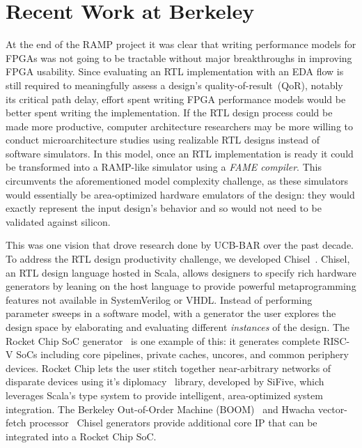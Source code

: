 \section{Recent Work at Berkeley}

At the end of the RAMP project it was clear that writing performance models for
FPGAs was not going to be tractable without major breakthroughs in improving
FPGA usability. Since evaluating an RTL implementation with an EDA flow is still
required to meaningfully assess a design's quality-of-result~(QoR), notably its critical path
delay, effort spent writing FPGA performance models would be better spent
writing the implementation. If the RTL design process could be made more productive,
computer architecture researchers may be more willing to conduct
microarchitecture studies using realizable RTL designs instead of software
simulators. In this model, once an RTL implementation is ready it could be
transformed into a RAMP-like simulator using a \emph{FAME compiler}. This circumvents the aforementioned model complexity challenge,
as these simulators would essentially be area-optimized hardware emulators of the design:
they would exactly represent the input design's behavior and so would not need
to be validated against silicon.

This was one vision that drove research done by UCB-BAR over the past decade.
To address the RTL design productivity challenge, we developed
Chisel~\cite{Chisel}. Chisel, an RTL design language hosted in Scala, allows
designers to specify rich hardware generators by leaning on the host language to provide
powerful metaprogramming features not available in SystemVerilog or VHDL.
Instead of performing parameter sweeps in a software model, with a generator
the user explores the design space by elaborating and evaluating different
\emph{instances} of the design. The Rocket Chip SoC generator~\cite{RocketChip} is one example of this: it generates complete RISC-V SoCs including
core pipelines, private caches, uncores, and common periphery devices. Rocket
Chip lets the user stitch together near-arbitrary networks of disparate devices
using it's diplomacy~\cite{Diplomacy} library, developed by SiFive, which leverages Scala's type
system to provide intelligent, area-optimized system integration. The
Berkeley Out-of-Order Machine (BOOM)~\cite{BOOM} and Hwacha vector-fetch
processor~\cite{Hwacha} Chisel generators provide additional core IP that can be
integrated into a Rocket Chip SoC.

